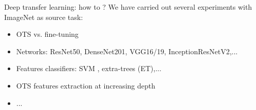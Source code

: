 \documentclass{beamer}
\begin{document}
\begin{frame}{Deep transfer learning: how to ?}
\vfill
We have carried out {several experiments} with {ImageNet} as source task:
\vfill
\begin{itemize}
	 \item {OTS} vs. {fine-tuning}
	 \item {Networks}: ResNet50, DenseNet201, VGG16/19, InceptionResNetV2,...
	 \item {Features classifiers}: SVM , extra-trees (ET),...
	 \item OTS features extraction at {increasing depth}
	 \item ...
\end{itemize}
\vfill
\end{frame}
\end{document}
